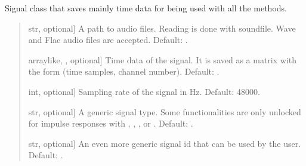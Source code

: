 \documentclass[letterpaper,10pt,english]{sphinxmanual}
\begin{document}
\begin{fulllineitems}
\begin{fulllineitems}
\label{\detokenize{classes:dsptools.classes.signal_class.Signal.__init__}}
\pysigstartsignatures
{}
\pysigstopsignatures
\sphinxAtStartPar
Signal class that saves mainly time data for being used with all the
methods.
\begin{quote}\begin{description}
\begin{description}
\sphinxlineitem{\sphinxstylestrong{path}}{[}str, optional{]}
\sphinxAtStartPar
A path to audio files. Reading is done with soundfile. Wave and
Flac audio files are accepted.
Default: .

\sphinxlineitem{\sphinxstylestrong{time\_data}}{[}array\sphinxhyphen{}like, , optional{]}
\sphinxAtStartPar
Time data of the signal. It is saved as a matrix with the form
(time samples, channel number). Default: .

\sphinxlineitem{\sphinxstylestrong{sampling\_rate\_hz}}{[}int, optional{]}
\sphinxAtStartPar
Sampling rate of the signal in Hz. Default: 48000.

\sphinxlineitem{\sphinxstylestrong{signal\_type}}{[}str, optional{]}
\sphinxAtStartPar
A generic signal type. Some functionalities are only unlocked for
impulse responses with , , ,  or .
Default: .

\sphinxlineitem{\sphinxstylestrong{signal\_id}}{[}str, optional{]}
\sphinxAtStartPar
An even more generic signal id that can be used by the user.
Default: .


\end{description}
\end{description}
\end{quote}
\end{fulllineitems}
\end{fulllineitems}
\end{document}
